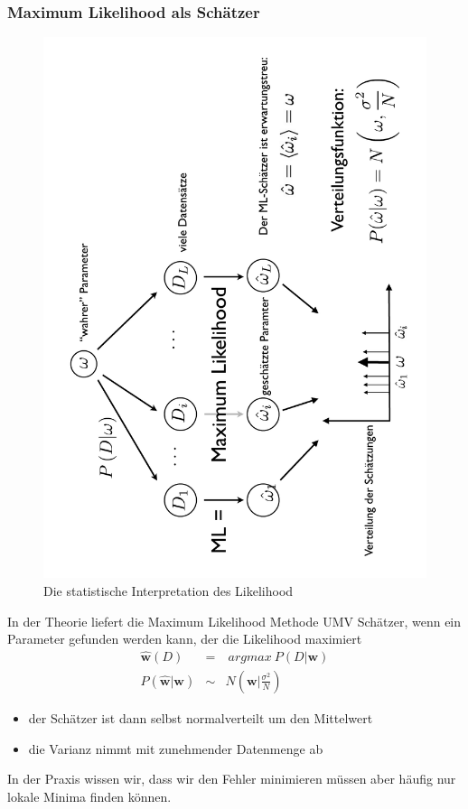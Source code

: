 	\subsubsection{Maximum Likelihood als Schätzer}
		\begin{figure}[ht]
		\centering
		\includegraphics[angle=-90, width=.9\textwidth]{img/ml_schaetzer}
		\caption{Die statistische Interpretation des Likelihood}
		\label{deployment}
	\end{figure}
	In der Theorie liefert die Maximum Likelihood Methode UMV Schätzer, wenn ein Parameter gefunden werden kann, der die Likelihood maximiert
	\begin{eqnarray*}
		\pmb{\hat{w}}(D) &=&~argmax~P(D\vert \pmb{w})\\
		P(\pmb{\hat{w}}\vert \pmb{w}) &\sim& N(\pmb{w}\vert \frac{\sigma^2}{N}) 
	\end{eqnarray*}
	\begin{itemize}
		\item der Schätzer ist dann selbst normalverteilt um den Mittelwert
		\item die Varianz nimmt mit zunehmender Datenmenge ab
	\end{itemize}
	In der Praxis wissen wir, dass wir den Fehler minimieren müssen aber häufig nur lokale Minima finden können.
